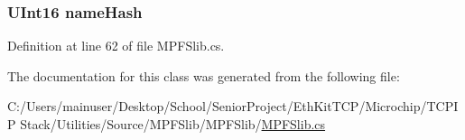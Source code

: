 \hypertarget{class_microchip_1_1_file_record_aeb0642208aa779de12a59f1cd4e7ee94}{}
\subsubsection[{name\+Hash}]{\setlength{\rightskip}{0pt plus 5cm}U\+Int16 name\+Hash}\label{class_microchip_1_1_file_record_aeb0642208aa779de12a59f1cd4e7ee94}


Definition at line 62 of file M\+P\+F\+Slib.\+cs.



The documentation for this class was generated from the following file\+:\begin{DoxyCompactItemize}
\item 
C\+:/\+Users/mainuser/\+Desktop/\+School/\+Senior\+Project/\+Eth\+Kit\+T\+C\+P/\+Microchip/\+T\+C\+P\+I\+P Stack/\+Utilities/\+Source/\+M\+P\+F\+Slib/\+M\+P\+F\+Slib/\hyperlink{_m_p_f_slib_8cs}{M\+P\+F\+Slib.\+cs}\end{DoxyCompactItemize}
